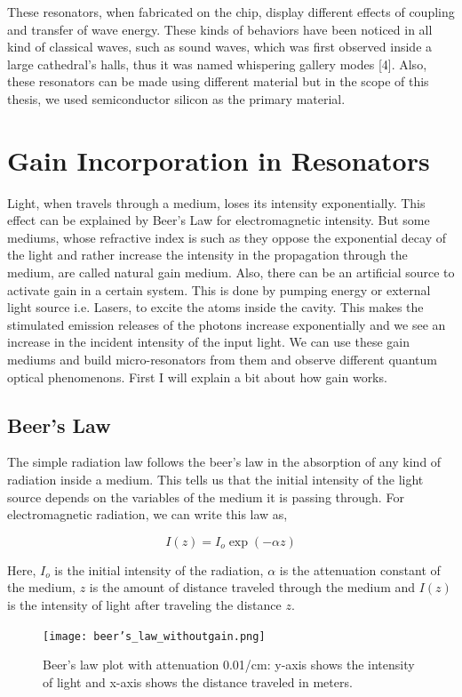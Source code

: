 These resonators, when fabricated on the chip, display different effects of coupling and transfer of wave energy. These kinds of behaviors have been noticed in all kind of classical waves, such as sound waves, which was first observed inside a large cathedral's halls, thus it was named whispering gallery modes [4]. Also, these resonators can be made using different material but in the scope of this thesis, we used semiconductor silicon as the primary material. 


\section{Gain Incorporation in Resonators}
Light, when travels through a medium, loses its intensity exponentially. This effect can be explained by Beer's Law for electromagnetic intensity. But some mediums, whose refractive index is such as they oppose the exponential decay of the light and rather increase the intensity in the propagation through the medium, are called natural gain medium. Also, there can be an artificial source to activate gain in a certain system. This is done by pumping energy or external light source i.e. Lasers, to excite the atoms inside the cavity. This makes the stimulated emission releases of the photons increase exponentially and we see an increase in the incident intensity of the input light. We can use these gain mediums and build micro-resonators from them and observe different quantum optical phenomenons. First I will explain a bit about how gain works.


\subsection{Beer's Law}
The simple radiation law follows the beer's law in the absorption of any kind of radiation inside a medium. This tells us that the initial intensity of the light source depends on the variables of the medium it is passing through. For electromagnetic radiation, we can write this law as,

\begin{equation}
I(z) = I_{o}\exp(-\alpha z)
\end{equation}

Here, $I_{o}$ is the initial intensity of the radiation, $\alpha$ is the attenuation constant of the medium, $z$ is the amount of distance traveled through the medium and $I(z)$ is the intensity of light after traveling the distance $z$.

\begin{figure}[h]
\centering
\texttt{[image: beer's\_law\_withoutgain.png]}
\caption{Beer's law plot with attenuation 0.01/cm: y-axis shows the intensity of light and x-axis shows the distance traveled in meters.}
\end{figure}


